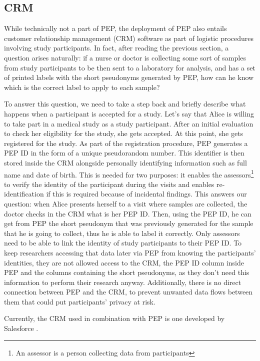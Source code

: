 \documentclass{report}
\begin{document}
\subsection{CRM}\label{CRM}
While technically not a part of PEP, the deployment of PEP also entails customer relationship management (CRM) software as part of logistic procedures involving study participants. In 
fact, after reading the previous section, a question arises naturally: if a nurse or doctor is collecting some sort of samples from study participants to be then sent to a laboratory 
for analysis, and has a set of printed labels with the short pseudonyms generated by PEP, how can he know which is the correct label to apply to each sample? \par
To answer this question, we need to take a step back and briefly describe what happens when a participant is accepted for a study. Let's say that Alice is willing to take part in a
medical study as a study participant. After an initial evaluation to check her eligibility for the study, she gets accepted. At this point, she gets registered for the study. As
part of the registration procedure, PEP generates a PEP ID in the form of a unique pseudorandom number. This identifier is then stored inside the CRM alongside personally
identifying information such as full name and date of birth. This is needed for two purposes: it enables the assessors\footnote{An assessor is a person collecting data from
participants} to verify the identity of the participant during the visits and enables re-identification if this is required because of incidental findings. This answers our
question: when Alice presents herself to a visit where samples are collected, the doctor checks in the CRM what is her PEP ID. Then, using the PEP ID, he can get from PEP the short
pseudonym that was previously generated for the sample that he is going to collect, thus he is able to label it correctly. Only assessors need to be able to link the identity of
study participants to their PEP ID. To keep researchers accessing that data later via PEP from knowing the participants' identities, they are not allowed access to the CRM, the
PEP ID column inside PEP and the columns containing the short pseudonyms, as they don't need this information to perform their research anyway. Additionally, there is no direct
connection between PEP and the CRM, to prevent unwanted data flows between them that could put participants' privacy at risk.\par
Currently, the CRM used in combination with PEP is one developed by Salesforce \cite{salesforce-website}.
\end{document}
